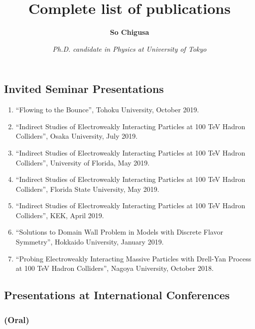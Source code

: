 \documentclass[12pt,notitlepage]{article}
\title{\vspace*{-3cm}Complete list of publications}
\author{\textbf{So Chigusa}}
\date{\vspace*{-4mm}\textit{Ph.D. candidate in Physics at University of Tokyo}}
\begin{document}
\maketitle

\nocite{*}



\subsection*{Invited Seminar Presentations}

\begin{enumerate}
  \item ``Flowing to the Bounce'', Tohoku University, October 2019.
  \item ``Indirect Studies of Electroweakly Interacting Particles at 100 TeV Hadron Colliders'', Osaka University, July 2019.
  \item ``Indirect Studies of Electroweakly Interacting Particles at 100 TeV Hadron Colliders'', University of Florida, May 2019.
  \item ``Indirect Studies of Electroweakly Interacting Particles at 100 TeV Hadron Colliders'', Florida State University, May 2019.
  \item ``Indirect Studies of Electroweakly Interacting Particles at 100 TeV Hadron Colliders'', KEK, April 2019.
  \item ``Solutions to Domain Wall Problem in Models with Discrete Flavor Symmetry'', Hokkaido University, January 2019.
  \item ``Probing Electroweakly Interacting Massive Particles with Drell-Yan Process at 100 TeV Hadron Colliders'', Nagoya University, October 2018.
\end{enumerate}

\subsection*{Presentations at International Conferences}

\subsubsection*{(Oral)}
\end{document}
